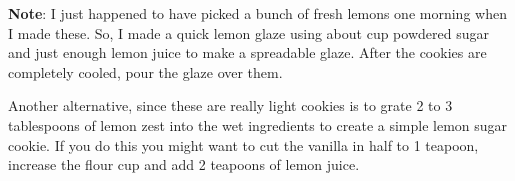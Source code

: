 \documentclass{article}
\begin{document}
\medskip

\textbf{Note}: I just happened to have picked a bunch of fresh lemons one morning when I
made these. So, I made a quick lemon glaze using about  cup powdered sugar and
just enough lemon juice to make a spreadable glaze. After the cookies are completely cooled,
pour the glaze over them.

Another alternative, since these are really light cookies is to grate 2 to 3 tablespoons of
lemon zest into the wet ingredients to create a simple lemon sugar cookie. If you do this you
might want to cut the vanilla in half to 1 teapoon, increase the flour  cup and
add 2 teapoons of lemon juice.
\end{document}
